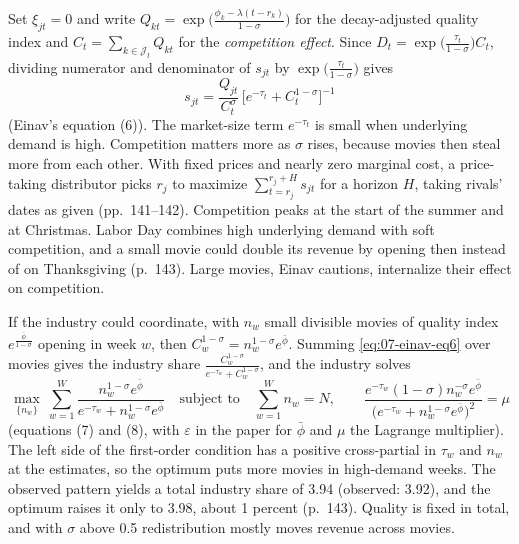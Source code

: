 Set $\xi_{jt} = 0$ and write $Q_{kt} = \exp\big(\frac{\phi_k - \lambda(t-r_k)}{1-\sigma}\big)$ for the
decay-adjusted quality index and $C_t = \sum_{k \in \mathcal{J}_t} Q_{kt}$ for the \emph{competition effect}. Since
$D_t = \exp\big(\frac{\tau_t}{1-\sigma}\big)C_t$, dividing numerator and denominator of $s_{jt}$ by
$\exp\big(\frac{\tau_t}{1-\sigma}\big)$ gives
\begin{equation}\label{eq:07-einav-eq6}
s_{jt} = \frac{Q_{jt}}{C_t^{\sigma}}\,\Big[e^{-\tau_t} + C_t^{1-\sigma}\Big]^{-1}
\end{equation}
(Einav's equation (6)). The market-size term $e^{-\tau_t}$ is small when underlying demand is high. Competition
matters more as $\sigma$ rises, because movies then steal more from each other. With fixed prices and nearly zero
marginal cost, a price-taking distributor picks $r_j$ to maximize $\sum_{t=r_j}^{r_j+H}s_{jt}$ for a horizon $H$,
taking rivals' dates as given (pp.~141--142). Competition peaks at the start of the summer and at Christmas. Labor
Day combines high underlying demand with soft competition, and a small movie could double its revenue by opening
then instead of on Thanksgiving (p.~143). Large movies, Einav cautions, internalize their effect on competition.

If the industry could coordinate, with $n_w$ small divisible movies of quality index $e^{\frac{\bar\phi}{1-\sigma}}$
opening in week $w$, then $C_w^{1-\sigma} = n_w^{1-\sigma}e^{\bar\phi}$. Summing \eqref{eq:07-einav-eq6} over movies
gives the industry share $\frac{C_w^{1-\sigma}}{e^{-\tau_w} + C_w^{1-\sigma}}$, and the industry solves
\begin{equation}\label{eq:07-einav-eq7}
\max_{\{n_w\}}\ \sum_{w=1}^{W}\frac{n_w^{1-\sigma}e^{\bar\phi}}{e^{-\tau_w} + n_w^{1-\sigma}e^{\bar\phi}}
\quad\text{subject to}\quad \sum_{w=1}^{W} n_w = N,
\qquad
\frac{e^{-\tau_w}(1-\sigma)n_w^{-\sigma}e^{\bar\phi}}{\big(e^{-\tau_w} + n_w^{1-\sigma}e^{\bar\phi}\big)^2} = \mu
\end{equation}
(equations (7) and (8), with $\varepsilon$ in the paper for $\bar\phi$ and $\mu$ the Lagrange multiplier). The left side
of the first-order condition has a positive cross-partial in $\tau_w$ and $n_w$ at the estimates, so the optimum
puts more movies in high-demand weeks. The observed pattern yields a total industry share of 3.94 (observed:
3.92), and the optimum raises it only to 3.98, about 1 percent (p.~143). Quality is fixed in total, and with
$\sigma$ above 0.5 redistribution mostly moves revenue across movies.

